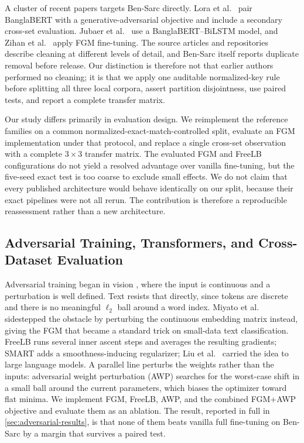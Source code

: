 \documentclass{ieeeaccess}
\newcommand{\dset}[1]{#1}
\begin{document}
A cluster of recent papers targets \dset{Ben-Sarc} directly. Lora et al.\ \cite{lora2023transformer} pair BanglaBERT with a generative-adversarial objective and include a secondary cross-set evaluation. Jubaer et al.\ \cite{bensarc_revisited2025} use a BanglaBERT--BiLSTM model, and Zihan et al.\ \cite{zihan2026fgm} apply FGM fine-tuning. The source articles and repositories describe cleaning at different levels of detail, and Ben-Sarc itself reports duplicate removal before release. Our distinction is therefore not that earlier authors performed no cleaning; it is that we apply one auditable normalized-key rule before splitting all three local corpora, assert partition disjointness, use paired tests, and report a complete transfer matrix.

Our study differs primarily in evaluation design. We reimplement the reference families on a common normalized-exact-match-controlled split, evaluate an FGM implementation under that protocol, and replace a single cross-set observation with a complete $3\!\times\!3$ transfer matrix. The evaluated FGM and FreeLB configurations do not yield a resolved advantage over vanilla fine-tuning, but the five-seed exact test is too coarse to exclude small effects. We do not claim that every published architecture would behave identically on our split, because their exact pipelines were not all rerun. The contribution is therefore a reproducible reassessment rather than a new architecture.

\subsection{Adversarial Training, Transformers, and Cross-Dataset Evaluation}
\label{sec:rw-adv-and-shift}

Adversarial training began in vision \cite{goodfellow2015explaining,madry2018pgd}, where the input is continuous and a perturbation is well defined. Text resists that directly, since tokens are discrete and there is no meaningful $\ell_2$ ball around a word index. Miyato et al.\ \cite{miyato2017adversarial} sidestepped the obstacle by perturbing the continuous embedding matrix instead, giving the FGM that became a standard trick on small-data text classification. FreeLB \cite{zhu2020freelb} runs several inner ascent steps and averages the resulting gradients; SMART \cite{jiang2020smart} adds a smoothness-inducing regularizer; Liu et al.\ \cite{liu2020adversarial} carried the idea to large language models. A parallel line perturbs the weights rather than the inputs: adversarial weight perturbation (AWP) \cite{wu2020awp} searches for the worst-case shift in a small ball around the current parameters, which biases the optimizer toward flat minima. We implement FGM, FreeLB, AWP, and the combined FGM+AWP objective and evaluate them as an ablation. The result, reported in full in \cref{sec:adversarial-results}, is that none of them beats vanilla full fine-tuning on \dset{Ben-Sarc} by a margin that survives a paired test.
\end{document}

